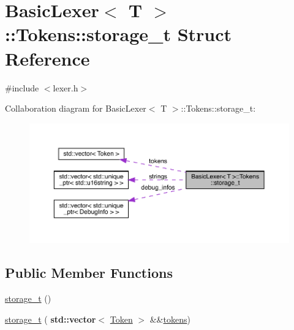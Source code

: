 \hypertarget{struct_basic_lexer_1_1_tokens_1_1storage__t}{}\section{Basic\+Lexer$<$ T $>$\+:\+:Tokens\+:\+:storage\+\_\+t Struct Reference}
\label{struct_basic_lexer_1_1_tokens_1_1storage__t}


{\ttfamily \#include $<$lexer.\+h$>$}



Collaboration diagram for Basic\+Lexer$<$ T $>$\+:\+:Tokens\+:\+:storage\+\_\+t\+:
\nopagebreak
\begin{figure}[H]
\begin{center}
\leavevmode
\includegraphics[width=350pt]{struct_basic_lexer_1_1_tokens_1_1storage__t__coll__graph}
\end{center}
\end{figure}
\subsection*{Public Member Functions}
\begin{DoxyCompactItemize}
\item 
\hyperlink{struct_basic_lexer_1_1_tokens_1_1storage__t_a93eb78f3f158d806a2c02934bbdea859}{storage\+\_\+t} ()
\item 
\hyperlink{struct_basic_lexer_1_1_tokens_1_1storage__t_adc2ef25135af9c48c8694187fa39f527}{storage\+\_\+t} (\textbf{ std\+::vector}$<$ \hyperlink{class_token}{Token} $>$ \&\&\hyperlink{struct_basic_lexer_1_1_tokens_1_1storage__t_a5150826387fcf46d98647a4d4e3fc83f}{tokens})
\end{DoxyCompactItemize}
